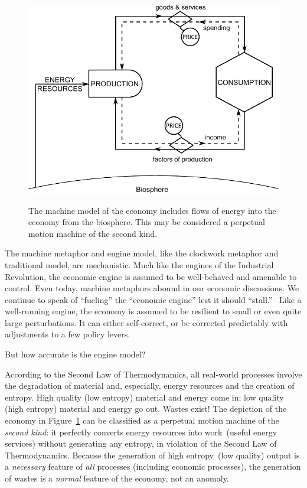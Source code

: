 \begin{figure}[H]
\centering\
\includegraphics[width=\linewidth]{Part_0/Chapter_Introduction/images/Perpetual_motion_2.pdf}
\caption[The machine model]{The machine model of the economy includes
flows of energy into the economy from the biosphere.
This may be considered a perpetual motion machine 
of the second kind.}
\label{fig:perp_motion_2}
\end{figure}

The machine metaphor and engine model,
like the clockwork metaphor and traditional model,
are mechanistic.
Much like the engines of the Industrial Revolution,
the economic engine is assumed to be well-behaved and amenable to control.
Even today, machine metaphors abound in our economic discussions.
We continue to speak of ``fueling'' the ``economic engine'' 
lest it should ``stall.''~\cite{Liu2012}
Like a well-running engine, the economy is assumed 
to be resilient to small or even quite large perturbations.  
It can either self-correct, 
or be corrected predictably with adjustments to
a few policy levers.

But how accurate is the engine model?

According to the Second Law of Thermodynamics,
all real-world processes involve the degradation
of material and, especially, energy resources
and the creation of entropy.  
High quality (low entropy) material and energy come in;
low quality (high entropy) material and energy go out.
Wastes exist!
The depiction of the economy in Figure~\ref{fig:perp_motion_2} 
can be classified as a perpetual motion machine
of the \emph{second kind}:
it perfectly converts energy resources into 
work~(useful energy services) without generating
any entropy,
in violation of the Second Law of Thermodynamics.
Because the generation of high entropy~(low quality)
output is a \emph{necessary} feature of \emph{all} processes 
(including economic processes),
the generation of wastes is a \emph{normal} feature of
the economy,
not an anomaly.

